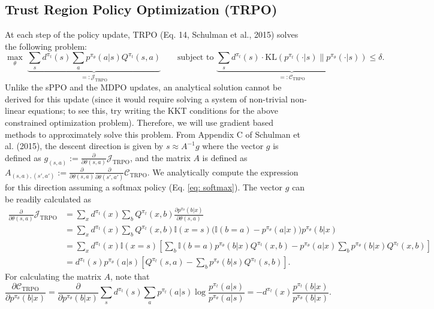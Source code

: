 \documentclass[a4paper, 10pt]{article}
\begin{document}
\subsection{Trust Region Policy Optimization (TRPO)}
At each step of the policy update, TRPO (Eq. 14, Schulman et al., 2015) solves the following problem:
\begin{equation}
  \max_\theta \; \underbrace{\sum_s d^{\pi_t}(s) \sum_a p^{\pi_\theta}(a | s) Q^{\pi_t}(s, a)}_{=: \mathcal{J}_{\text{TRPO}}} \qquad \text{subject to } \underbrace{\sum_s d^{\pi_t}(s) \cdot \text{KL}(p^{\pi_t}(\cdot | s) \| p^{\pi_\theta}(\cdot | s))}_{=: \mathcal{C}_{\text{TRPO}}} \leq \delta.  
\end{equation}
Unlike the sPPO and the MDPO updates, an analytical solution cannot be derived for this update (since it would require solving a system of non-trivial non-linear equations; to see this, try writing the KKT conditions for the above constrained optimization problem). Therefore, we will use gradient based methods to approximately solve this problem. From Appendix C of Schulman et al. (2015), the descent direction is given by $s \approx A^{-1} g$ where the vector $g$ is defined as $g_{(s, a)} := \frac{\partial}{\partial \theta(s, a)} \mathcal{J}_{\text{TRPO}}$, and the matrix $A$ is defined as $A_{(s, a), (s', a')} := \frac{\partial}{\partial \theta(s, a)} \frac{\partial}{\partial \theta(s', a')} \mathcal{C}_{\text{TRPO}}$. We analytically compute the expression for this direction assuming a softmax policy (Eq. \ref{eq: softmax}). The vector $g$ can be readily calculated as
\begin{align}
  \frac{\partial}{\partial \theta(s, a)} \mathcal{J}_{\text{TRPO}} &= \sum_x d^{\pi_t}(x) \sum_b Q^{\pi_t}(x, b) \frac{\partial p^{\pi_\theta}(b | x)}{\partial \theta(s, a)} \nonumber \\
  &= \sum_x d^{\pi_t}(x) \sum_b Q^{\pi_t}(x, b) \mathbb{I}(x = s) \Big( \mathbb{I}(b = a) - p^{\pi_\theta}(a | x) \Big) p^{\pi_\theta}(b | x) \nonumber \\
  &= \sum_x d^{\pi_t}(x) \mathbb{I}(x = s) \left[ \sum_b \mathbb{I}(b = a) p^{\pi_\theta}(b | x) Q^{\pi_t}(x, b) - p^{\pi_\theta}(a | x) \sum_b p^{\pi_\theta}(b | x) Q^{\pi_t}(x, b) \right] \nonumber \\
  &= d^{\pi_t}(s) p^{\pi_\theta}(a | s) \left[ Q^{\pi_t}(s, a) - \sum_b p^{\pi_\theta}(b | s) Q^{\pi_t}(s, b) \right]. \label{eq: trpo_gradient}
\end{align}
For calculating the matrix $A$, note that
\begin{equation*}
  \frac{\partial \mathcal{C}_{\text{TRPO}}}{\partial p^{\pi_\theta}(b | x)} = \frac{\partial}{\partial p^{\pi_\theta}(b | x)} \sum_s d^{\pi_t}(s) \sum_a p^{\pi_t}(a | s) \log \frac{p^{\pi_t}(a | s)}{p^{\pi_\theta}(a | s)} = - d^{\pi_t}(x) \frac{p^{\pi_t}(b | x)}{p^{\pi_\theta}(b | x)}.
\end{equation*}
\end{document}
